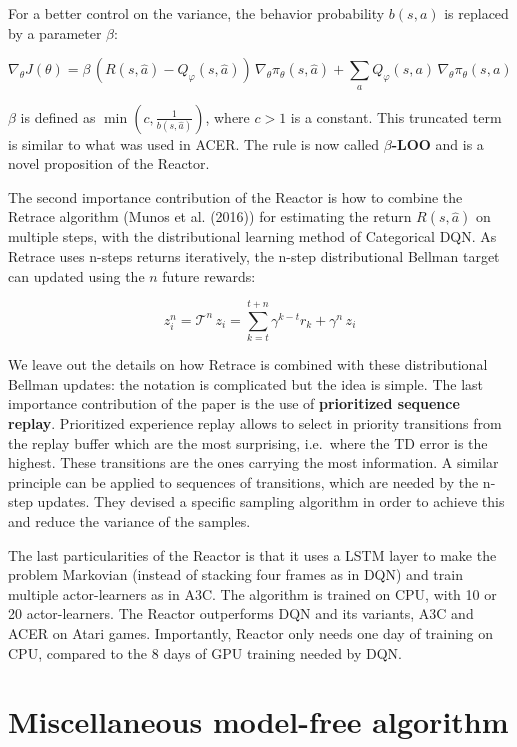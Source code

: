 \documentclass[
  letterpaper,
  DIV=11,
  numbers=noendperiod]{scrreprt}
\begin{document}
For a better control on the variance, the behavior probability
\(b(s, a)\) is replaced by a parameter \(\beta\):

\[
    \nabla_\theta J(\theta) = \beta \, (R(s, \hat{a}) - Q_\varphi(s, \hat{a})) \, \nabla_\theta \pi_\theta(s, \hat{a}) + \sum_a Q_\varphi(s, a) \, \nabla_\theta \pi_\theta(s, a)
\]

\(\beta\) is defined as \(\min (c, \frac{1}{b(s, \hat{a})})\), where
\(c>1\) is a constant. This truncated term is similar to what was used
in ACER. The rule is now called \textbf{\(\beta\)-LOO} and is a novel
proposition of the Reactor.

The second importance contribution of the Reactor is how to combine the
Retrace algorithm (Munos et al. (2016)) for estimating the return
\(R(s, \hat{a})\) on multiple steps, with the distributional learning
method of Categorical DQN. As Retrace uses n-steps returns iteratively,
the n-step distributional Bellman target can updated using the \(n\)
future rewards:

\[
    z_i^n = \mathcal{T}^n \, z_i = \sum_{k=t}^{t+n} \gamma^{k-t} r_k + \gamma^n \, z_i
\]

We leave out the details on how Retrace is combined with these
distributional Bellman updates: the notation is complicated but the idea
is simple. The last importance contribution of the paper is the use of
\textbf{prioritized sequence replay}. Prioritized experience replay
allows to select in priority transitions from the replay buffer which
are the most surprising, i.e.~where the TD error is the highest. These
transitions are the ones carrying the most information. A similar
principle can be applied to sequences of transitions, which are needed
by the n-step updates. They devised a specific sampling algorithm in
order to achieve this and reduce the variance of the samples.

The last particularities of the Reactor is that it uses a LSTM layer to
make the problem Markovian (instead of stacking four frames as in DQN)
and train multiple actor-learners as in A3C. The algorithm is trained on
CPU, with 10 or 20 actor-learners. The Reactor outperforms DQN and its
variants, A3C and ACER on Atari games. Importantly, Reactor only needs
one day of training on CPU, compared to the 8 days of GPU training
needed by DQN.


\hypertarget{miscellaneous-model-free-algorithm}{%
\chapter{Miscellaneous model-free
algorithm}\label{miscellaneous-model-free-algorithm}}
\end{document}
